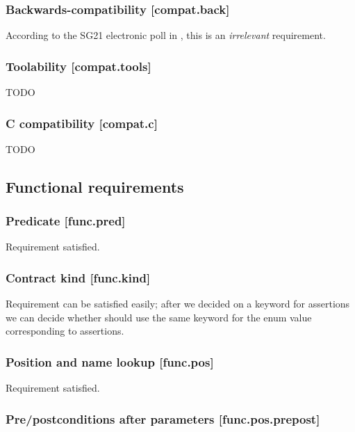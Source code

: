 \subsubsection{Backwards-compatibility  [compat.back]}

According to the SG21 electronic poll in \cite{P2885R2}, this is an \emph{irrelevant} requirement.

\subsubsection{Toolability [compat.tools]}

TODO

\subsubsection{C compatibility  [compat.c]}

TODO

\subsection{Functional requirements}

\subsubsection{Predicate  [func.pred]}

Requirement satisfied.

\subsubsection{Contract kind  [func.kind]}

Requirement can be satisfied easily; after we decided on a keyword for assertions we can decide whether  should use the same keyword for the enum value corresponding to assertions.

\subsubsection{Position and name lookup [func.pos]}

Requirement satisfied.

\subsubsection{Pre/postconditions after parameters [func.pos.prepost]}

